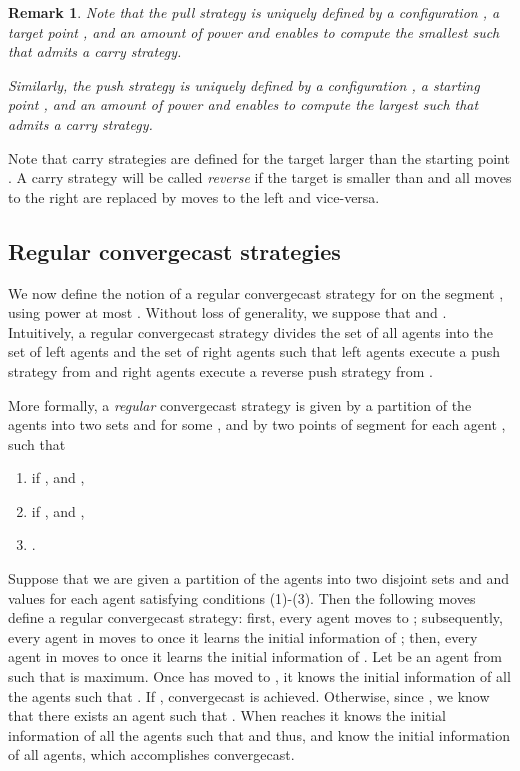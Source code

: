 \documentclass{article}
\newtheorem{remark}{Remark}
\newcommand\convergecast{convergecast\xspace}
\newcommand\subproblem{carry\xspace}
\begin{document}
\begin{remark}\label{rem-pull-push}
Note that the pull strategy is uniquely defined by a configuration
, a target point , and an amount of power  and enables
to compute the smallest  such that  admits a
\subproblem strategy.

Similarly, the push strategy is uniquely defined by a configuration
, a starting point , and an amount of power  and enables
to compute the largest  such that  admits a
\subproblem strategy.
\end{remark}

Note that carry strategies are defined for the target  larger than the starting point . A carry strategy will be called \emph{reverse} if the target  is smaller than  and all moves to the right are replaced by moves to the left and vice-versa.


\subsection{Regular convergecast strategies}

We now define the notion of a regular convergecast strategy for  on the segment , using power at most . 
Without loss of generality, we suppose that  and . Intuitively, a regular convergecast strategy divides the set of all agents into the set of left agents and the set of right agents such that left agents execute a push strategy from  and right agents execute a reverse push strategy from .

More formally, a \emph{regular} convergecast strategy is given by a partition of the agents into two sets  and  for some , and by two points  of segment 
for each
agent ,
such that
\begin{enumerate}[(1)]
\item if ,  and
  ,
\item if ,  and , 
\item .
\end{enumerate}



Suppose that we are given a partition of the agents into two
disjoint sets  and  and values  for each
agent  satisfying conditions (1)-(3). Then the following moves define a regular convergecast strategy: first, every agent  moves to ;
subsequently, every agent in  moves to  once it learns the initial
information of ; then, every agent in  moves to  once
it learns the initial information of .  Let  be an agent from 
such that  is maximum. Once  has moved to , it knows
the initial information of all the agents  such that . If , {\convergecast} is achieved. Otherwise,
since , we know that there exists an agent  such that .  When  reaches  it knows the initial
information of all the agents such that  and thus, 
and  know the initial information of all agents, which accomplishes convergecast.
\end{document}
